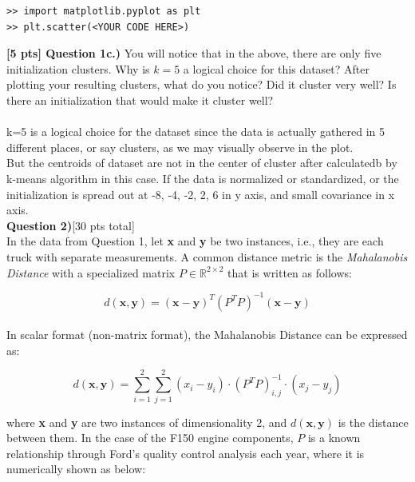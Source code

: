 \documentclass[paper=a4, fontsize=11pt]{scrartcl} %
\begin{document}
\begin{verbatim}
>> import matplotlib.pyplot as plt
>> plt.scatter(<YOUR CODE HERE>)
\end{verbatim}

\textbf{[5 pts] Question 1c.)} You will notice that in the above, there are only five initialization clusters. Why is $k=5$ a logical choice for this dataset? After plotting your resulting clusters, what do you notice? Did it cluster very well? Is there an initialization that would make it cluster well?\\
\\

k=5 is a logical choice for the dataset since the data is actually gathered in 5 different places, or say clusters, as we may visually observe in the plot. \\
But the centroids of dataset are not in the center of cluster after calculatedb by k-means algorithm in this case. If the data is normalized or standardized, or the initialization is spread out at -8, -4, -2, 2, 6 in y axis, and small covariance in x axis. 
\\



{\Large \textbf{Question 2)}[30 pts total]} \\

In the data from Question 1, let \textbf{x} and \textbf{y} be two instances, i.e., they are each truck with separate measurements.  A common distance metric is the \emph{Mahalanobis Distance} with a specialized matrix $P \in \mathbb{R}^{2 \times 2}$ that is written as follows: 

\begin{equation}
d(\textbf{x}, \textbf{y}) = ( \textbf{x} - \textbf{y} )^T (P^T P)^{-1} ( \textbf{x} - \textbf{y} )
\nonumber
\end{equation} \\

In scalar format (non-matrix format), the Mahalanobis Distance can be expressed as:

\begin{equation}
    d(\textbf{x}, \textbf{y}) = \sum_{i=1}^2 \sum_{j=1}^2 (x_i - y_i) \cdot (P^T P)^{-1}_{i,j} \cdot (x_j - y_j)
    \nonumber
\end{equation}

where \textbf{x} and \textbf{y} are two instances of dimensionality 2, and $d(\textbf{x}, \textbf{y})$ is the distance between them. In the case of the F150 engine components, $P$ is a known relationship through Ford's quality control analysis each year, where it is numerically shown as below: \\
\end{document}
